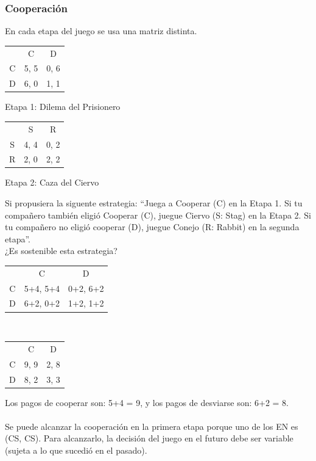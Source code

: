\documentclass{article}
\begin{document}
            \subsubsection*{Cooperación}
                En cada etapa del juego se usa una matriz distinta.
                \begin{table}[H]
                    \centering
                        \begin{tabular}{|c|c|c|}
                                & C     & D     \\
                            C   & 5, 5  & 0, 6  \\
                            D   & 6, 0  & 1, 1  \\
                        \end{tabular}
                    Etapa 1: Dilema del Prisionero
                        \begin{tabular}{|c|c|c|}
                                & S     & R     \\
                            S   & 4, 4  & 0, 2  \\
                            R   & 2, 0  & 2, 2  \\
                        \end{tabular}
                    Etapa 2: Caza del Ciervo                
                \end{table}
                Si propusiera la siguente estrategia: “Juega a Cooperar (C) en la Etapa 1. Si tu compañero también eligió Cooperar (C), juegue Ciervo (S: Stag) en la Etapa 2. Si tu compañero no eligió cooperar (D), juegue Conejo (R: Rabbit) en la segunda etapa”. \\
                ¿Es sostenible esta estrategia?
                \begin{table}[H]
                    \centering
                        \begin{tabular}{|c|c|c|}
                                & C         & D         \\
                            C   & 5+4, 5+4  & 0+2, 6+2  \\
                            D   & 6+2, 0+2  & 1+2, 1+2  \\
                        \end{tabular}
                        \\
                        \begin{tabular}{|c|c|c|}
                                & C     & D     \\
                            C   & 9, 9  & 2, 8  \\
                            D   & 8, 2  & 3, 3  \\
                        \end{tabular}             
                \end{table}
                Los pagos de cooperar son: 5+4 = 9, y los pagos de desviarse son: 6+2 = 8. \\
                \\
                Se puede alcanzar la cooperación en la primera etapa porque uno de los EN es (CS, CS). Para alcanzarlo, la decisión del juego en el futuro debe ser variable (sujeta a lo que sucedió en el pasado).
\end{document}

